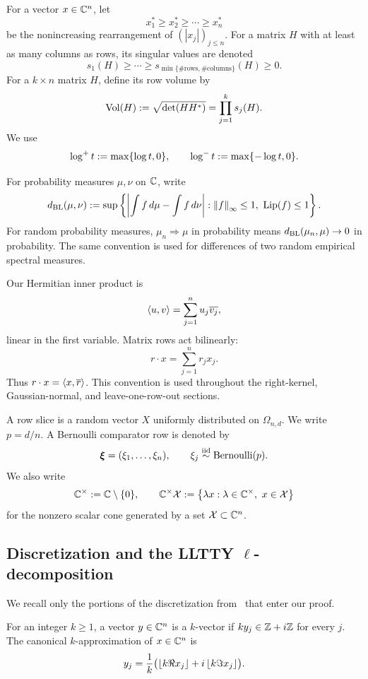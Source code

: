 For a vector $x\in\mathbb C^n$, let
\[
  x_1^*\ge x_2^*\ge\cdots\ge x_n^*
\]
be the nonincreasing rearrangement of $(|x_j|)_{j\le n}$. For a matrix $H$ with at least as many columns as rows, its singular values are denoted
\[
  s_1(H)\ge\cdots\ge s_{\min\{\#\text{rows},\#\text{columns}\}}(H)\ge0.
\]
For a $k\times n$ matrix $H$, define its row volume by
\[
  \operatorname{Vol}(H):=\sqrt{\det(HH^*)}=\prod_{j=1}^k s_j(H).
\]
We use
\[
  \log^{+} t:=\max\{\log t,0\},
  \qquad
  \log^{-} t:=\max\{-\log t,0\}.
\]

For probability measures $\mu,\nu$ on $\mathbb C$, write
\[
  d_{\mathrm{BL}}(\mu,\nu)
  :=\sup\left\{
    \left|\int f\,d\mu-\int f\,d\nu\right|:
    \left\|f\right\|_\infty\le1,
    \ \operatorname{Lip}(f)\le1
  \right\}.
\]
For random probability measures, $\mu_n\Rightarrow\mu$ in probability means $d_{\mathrm{BL}}(\mu_n,\mu)\to0$ in probability. The same convention is used for differences of two random empirical spectral measures.

Our Hermitian inner product is
\[
  \left\langle u,v\right\rangle=\sum_{j=1}^n u_j\overline{v_j},
\]
linear in the first variable. Matrix rows act bilinearly:
\[
  r\cdot x=\sum_{j=1}^n r_jx_j.
\]
Thus $r\cdot x=\left\langle x,\overline r\right\rangle$. This convention is used throughout the right-kernel, Gaussian-normal, and leave-one-row-out sections.

A row slice is a random vector $X$ uniformly distributed on $\Omega_{n,d}$. We write $p=d/n$. A Bernoulli comparator row is denoted by
\[
  \boldsymbol\xi=(\xi_1,\ldots,\xi_n),
  \qquad
  \xi_j\stackrel{\mathrm{iid}}\sim\operatorname{Bernoulli}(p).
\]
We also write
\[
  \mathbb C^\times:=\mathbb C\setminus\{0\},
  \qquad
  \mathbb C^\times\mathcal X:=\left\{\lambda x:\lambda\in\mathbb C^\times,\ x\in\mathcal X\right\}
\]
for the nonzero scalar cone generated by a set $\mathcal X\subset\mathbb C^n$.

\subsection{\texorpdfstring{Discretization and the LLTTY $\ell$-decomposition}{Discretization and the LLTTY ell-decomposition}}

We recall only the portions of the discretization from~\cite[Sections~5--7]{LLTTY19} that enter our proof.

\begin{definition}[$k$-vector]\label{def:k-vector}
For an integer $k\ge1$, a vector $y\in\mathbb C^n$ is a $k$-vector if $ky_j\in\mathbb Z+i\mathbb Z$ for every $j$. The canonical $k$-approximation of $x\in\mathbb C^n$ is
\[
  y_j=\frac1k\bigl(\left\lfloor k\Re x_j\right\rfloor+i\left\lfloor k\Im x_j\right\rfloor\bigr).
\]
\end{definition}

